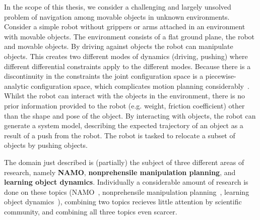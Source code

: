 In the scope of this thesis, we consider a challenging and largely unsolved problem of navigation among movable objects in unknown environments. Consider a simple robot without grippers or arms attached in an environment with movable objects. The environment consists of a flat ground plane, the robot and movable objects. By driving against objects the robot can manipulate objects.\bs
{}
This creates two different modes of dynamics (driving,  pushing) where different differential constraints apply to the different modes. Because there is a discontinuity in the constraints the joint configuration space is a piecewise-analytic configuration space, which complicates motion planning considerably~\cite{vega-brown_asymptotically_2020}. Whilst the robot can interact with the objects in the environment, there is no prior information provided to the robot (e.g. weight, friction coefficient) other than the shape and pose of the object. By interacting with objects, the robot can generate a system model, describing the expected trajectory of an object as a result of a push from the robot. The robot is tasked to relocate a subset of objects by pushing objects. \bs



The domain just described is (partially) the subject of three different areas of research, namely \textbf{\ac{NAMO}}, \textbf{nonprehensile manipulation planning}, and \textbf{learning object dynamics}. Individually a considerable amount of research is done on these topics (\ac{NAMO}~\cite{wang_affordancebased_2020,lavalle_planning_2006,elbanhawi_samplingbased_2014,kingston_samplingbased_2018,chen_fast_2018,ellis_navigation_2022}, nonprehensile manipulation planning~\cite{arruda_uncertainty_2017,mericli_pushmanipulation_2015,toussaint_sequenceofconstraints_2022,stuber_let_2020,stuber_featurebased_2018,bauza_dataefficient_2018}, learning object dynamics~\cite{seegmiller_vehicle_2013,cong_selfadapting_2020}), combining two topics recieves little attention by scientific community, and combining all three topics even scarcer.\bs


